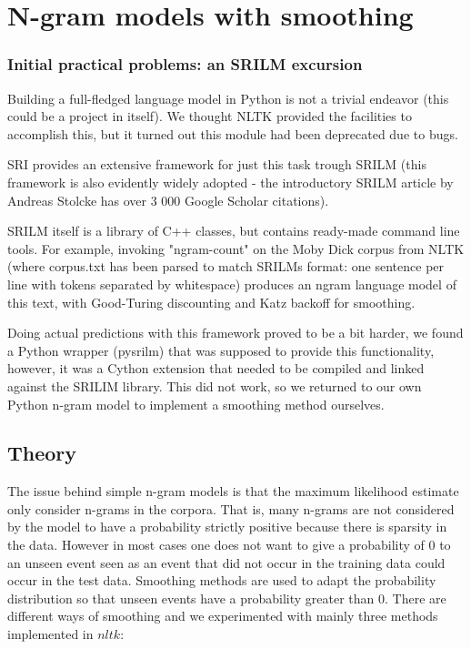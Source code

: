 \documentclass[a4paper,12pt]{article}
\begin{document}
\section{N-gram models with smoothing}
\subsubsection{Initial practical problems: an SRILM excursion}
Building a full-fledged language model in Python is not a trivial endeavor (this could be a project in itself). We thought NLTK provided the facilities to accomplish this, but it turned out this module had been deprecated due to bugs. 

SRI provides an extensive framework for just this task trough SRILM (this framework is also evidently widely adopted - the introductory SRILM article by Andreas Stolcke has over 3 000 Google Scholar citations). 

SRILM itself is a library of C++ classes, but contains ready-made command line tools. For example, invoking "ngram-count" on the Moby Dick corpus from NLTK (where corpus.txt has been parsed to match SRILMs format: one sentence per line with tokens separated by whitespace) produces an ngram language model of this text, with Good-Turing discounting and Katz backoff for smoothing.

Doing actual predictions with this framework proved to be a bit harder, we found a Python wrapper (pysrilm) that was supposed to provide this functionality, however, it was a Cython extension that needed to be compiled and linked against the SRILIM library. This did not work, so we returned to our own Python n-gram model to implement a smoothing method ourselves.

\label{sec:ngramsmoothing}

\subsection{Theory}
	The issue behind simple n-gram models is that the maximum likelihood estimate only consider n-grams in the corpora. That is, many n-grams are not considered by the model to have a probability strictly positive because there is sparsity in the data. However in most cases one does not want to give a probability of 0 to an unseen event seen as an event that did not occur in the training data could occur in the test data. Smoothing methods are used to adapt the probability distribution so that unseen events have a probability greater than 0. There are different ways of smoothing and we experimented with mainly three methods implemented in $nltk$:
	
\end{document}
